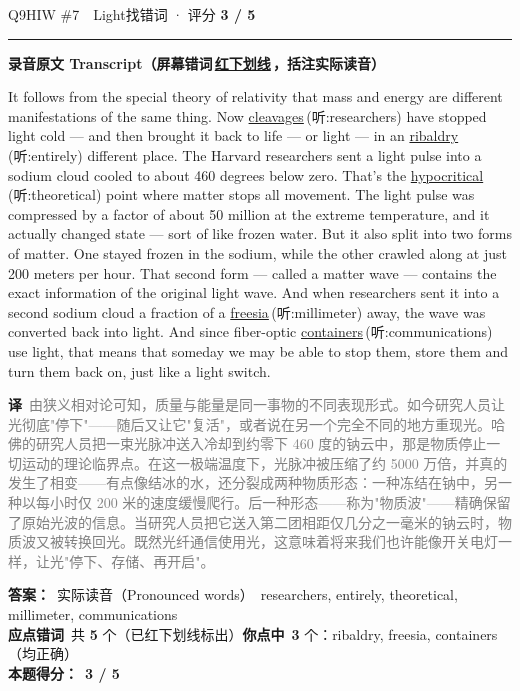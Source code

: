 \documentclass[11pt]{article}
\newcommand{\ptesub}[1]{%
  \par\needspace{2\baselineskip}\smallskip
  {\color{cAccent}\rule[-0.2ex]{3pt}{1.05em}}\hspace{6pt}%
  {\bfseries\color{cHead}#1}\par\nopagebreak\smallskip}
\newcommand{\zh}[1]{{\footnotesize\textcolor{cNote}{\textbf{译}}\ \textcolor{gray}{#1}}}
\newcommand{\hiw}[2]{{\color{cWrong}\uline{#1}}\,{\footnotesize\color{cFix}(听:#2)}} %
\begin{document}
\begin{qblock}{Q9\quad HIW \#7\ \ Light}{找错词 · 评分 \textcolor{cAccent}{\bfseries 3 / 5}}
\ptesub{录音原文 Transcript（屏幕错词\,{\color{cWrong}\uline{红下划线}}\,，括注实际读音）}
\begin{promptbox}
It follows from the special theory of relativity that mass and energy are different manifestations of the same thing. Now \hiw{cleavages}{researchers} have stopped light cold --- and then brought it back to life --- or light --- in an \hiw{ribaldry}{entirely} different place. The Harvard researchers sent a light pulse into a sodium cloud cooled to about 460 degrees below zero. That's the \hiw{hypocritical}{theoretical} point where matter stops all movement. The light pulse was compressed by a factor of about 50 million at the extreme temperature, and it actually changed state --- sort of like frozen water. But it also split into two forms of matter. One stayed frozen in the sodium, while the other crawled along at just 200 meters per hour. That second form --- called a matter wave --- contains the exact information of the original light wave. And when researchers sent it into a second sodium cloud a fraction of a \hiw{freesia}{millimeter} away, the wave was converted back into light. And since fiber-optic \hiw{containers}{communications} use light, that means that someday we may be able to stop them, store them and turn them back on, just like a light switch.
\end{promptbox}
\zh{由狭义相对论可知，质量与能量是同一事物的不同表现形式。如今研究人员让光彻底"停下"——随后又让它"复活"，或者说在另一个完全不同的地方重现光。哈佛的研究人员把一束光脉冲送入冷却到约零下 460 度的钠云中，那是物质停止一切运动的理论临界点。在这一极端温度下，光脉冲被压缩了约 5000 万倍，并真的发生了相变——有点像结冰的水，还分裂成两种物质形态：一种冻结在钠中，另一种以每小时仅 200 米的速度缓慢爬行。后一种形态——称为"物质波"——精确保留了原始光波的信息。当研究人员把它送入第二团相距仅几分之一毫米的钠云时，物质波又被转换回光。既然光纤通信使用光，这意味着将来我们也许能像开关电灯一样，让光"停下、存储、再开启"。}
\par\smallskip
\textbf{答案：}\ 实际读音（Pronounced words）\ {\color{cFix}researchers, entirely, theoretical, millimeter, communications}\\
\textbf{应点错词}\ 共 \textbf{5} 个（已红下划线标出）\qquad\textbf{你点中}\ \textbf{3} 个：ribaldry, freesia, containers（均正确）\\[2pt]\textbf{本题得分：}\ {\color{cAccent}\bfseries 3 / 5}
\end{qblock}
\end{document}
